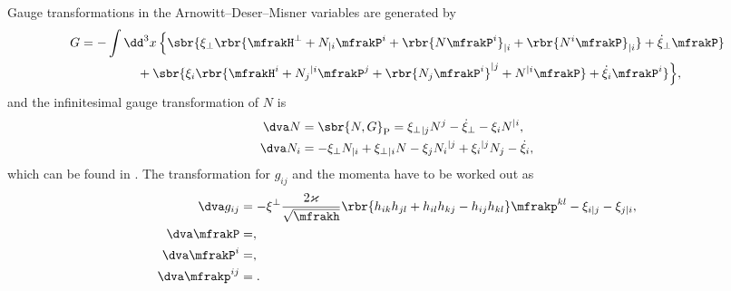 \documentclass[a4paper,11pt]{article}
\begin{document}
Gauge transformations in the Arnowitt--Deser--Misner variables are generated by 
\cite{Castellani1982} 
\begin{align}
G &= -\int\dd^3 x\,\Big\{ \sbr{
	\xi_\perp \rbr{
		\mfrakH^\perp + N_{|i} \mfrakP^i + \rbr{N\mfrakP^i}_{|i} + 
			\rbr{N^i \mfrakP}_{|i}} +
	\dot{\xi}_\perp \mfrakP}
	\nonumber \\ &\qquad\qquad\ \,+ \sbr{
	\xi_i \rbr{
		\mfrakH^i + N_j{}^{|i} \mfrakP^j + \rbr{N_j \mfrakP^i}^{|j} + N^{|i} 
\mfrakP} +
	\dot{\xi}_i \mfrakP^i} \Big\},
\end{align}
and the infinitesimal gauge transformation of $N$ is
\begin{align}
\dva N &= \sbr{N, G}_\text{P} = 
\xi_\perp{}_{|j} N^j - \dot{\xi}_\perp - \xi_i N^{|i}, \\
\dva N_i &= %
- \xi_\perp N_{|i} + \xi_\perp{}_{|i} N
- \xi_j N_{i}{}^{|j} + \xi_i{}^{|j} N_j - \dot{\xi}_i,
\end{align}
which can be found in \cite{Kiriushcheva2008}. The transformation for 
$g_{ij}$ and the momenta have to be worked out as
\begin{align}
\dva g_{ij} &= -\xi^\perp \frac{2\varkappa}{\sqrt{\mfrakh}}
\rbr{h_{ik}h_{jl}+h_{il}h_{kj}-h_{ij}h_{kl}}\mfrakp^{kl}
- \xi_{i|j} - \xi_{j|i}, \\
\dva \mfrakP &= ,\\
\dva \mfrakP^i &= ,\\
\dva \mfrakp^{ij} &= .\\
\end{align}





\printbibliography
\end{document}
